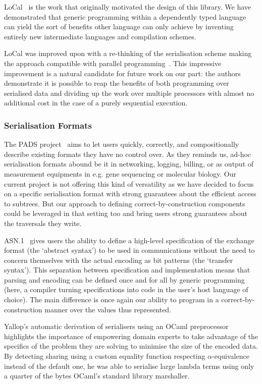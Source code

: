 LoCal~\citep{DBLP:conf/pldi/VollmerKRS0N19} is the work that originally
motivated the design of this library.
%
We have demonstrated that generic programming within a dependently typed
language can yield the sort of benefits other language can only achieve
by inventing entirely new intermediate languages and compilation schemes.

LoCal was improved upon with a re-thinking of the serialisation scheme
making the approach compatible with parallel
programming~\citep{DBLP:journals/pacmpl/KoparkarRVKN21}.
This impressive improvement is a natural candidate for future work on our
part: the authors demonstrate it is possible to reap the benefits of
both programming over serialised data
and dividing up the work over multiple processors
with almost no additional cost in the case of a purely sequential execution.

\subsubsection{Serialisation Formats}

The PADS project~\citep{DBLP:conf/popl/MandelbaumFWFG07} aims to let users
quickly, correctly, and compositionally describe existing formats they
have no control over.
%
As they reminds us, ad-hoc serialisation formats abound be it in
networking, logging, billing, or as output of measurement equipments
in e.g. gene sequencing or molecular biology.
%
Our current project is not offering this kind of versatility as we have
decided to focus on a specific serialisation format with strong
guarantees about the efficient access to subtrees.
%
But our approach to defining correct-by-construction components could
be leveraged in that setting too and bring users strong guarantees about
the traversals they write.

ASN.1~\citep{MANUAL:book/larmouth1999} gives users the ability to define
a high-level specification of the exchange format (the `abstract syntax')
to be used in communications without the need to concern themselves with
the actual encoding as bit patterns (the `transfer syntax').
%
This separation between specification and implementation means that parsing
and encoding can be defined once and for all by generic programming
(here, a compiler turning specifications into code in the user's host
language of choice).
%
The main difference is once again our ability to program in a
correct-by-construction manner over the values thus represented.


Yallop's automatic derivation of serialisers using an OCaml
preprocessor~\citep{DBLP:conf/ml/Yallop07} highlights the importance
of empowering domain experts to take advantage of the specifics of
the problem they are solving to minimise the size of the encoded data.
%
By detecting sharing using a custom equality function respecting
$\alpha$-equivalence instead of the default one, he was able to
serialise large lambda terms using only
a quarter of the bytes OCaml's standard library marshaller.

